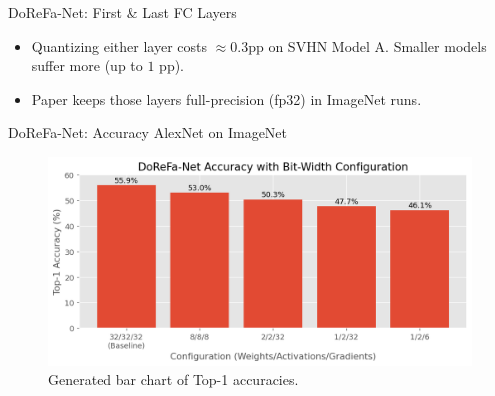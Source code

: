 \documentclass[aspectratio=169]{beamer} %
\begin{document}
\begin{frame}{DoReFa-Net: First \& Last FC Layers}
  \begin{itemize}
    \item Quantizing either layer costs $\approx 0.3$pp on SVHN Model A. Smaller models
          suffer more (up to $1$ pp).
    \item Paper keeps those layers full-precision (fp32) in ImageNet runs.
  \end{itemize}
\end{frame}

\begin{frame}{DoReFa-Net: Accuracy AlexNet on ImageNet}
  \begin{figure}
    \centering
    \includegraphics[width=\linewidth]{figures/dorefaRes.png}
    \caption*{\scriptsize Generated bar chart of Top-1 accuracies.}
  \end{figure}
\end{frame}
\end{document}

